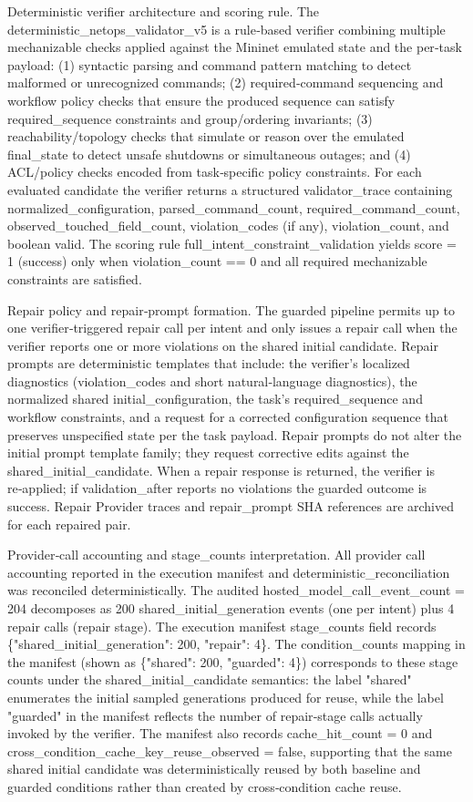 \documentclass[conference]{IEEEtran}
\begin{document}
Deterministic verifier architecture and scoring rule. The deterministic\_netops\_validator\_v5 is a rule‑based verifier combining multiple mechanizable checks applied against the Mininet emulated state and the per‑task payload: (1) syntactic parsing and command pattern matching to detect malformed or unrecognized commands; (2) required‑command sequencing and workflow policy checks that ensure the produced sequence can satisfy required\_sequence constraints and group/ordering invariants; (3) reachability/topology checks that simulate or reason over the emulated final\_state to detect unsafe shutdowns or simultaneous outages; and (4) ACL/policy checks encoded from task‑specific policy constraints. For each evaluated candidate the verifier returns a structured validator\_trace containing normalized\_configuration, parsed\_command\_count, required\_command\_count, observed\_touched\_field\_count, violation\_codes (if any), violation\_count, and boolean valid. The scoring rule full\_intent\_constraint\_validation yields score = 1 (success) only when violation\_count == 0 and all required mechanizable constraints are satisfied.

Repair policy and repair‑prompt formation. The guarded pipeline permits up to one verifier‑triggered repair call per intent and only issues a repair call when the verifier reports one or more violations on the shared initial candidate. Repair prompts are deterministic templates that include: the verifier's localized diagnostics (violation\_codes and short natural‑language diagnostics), the normalized shared initial\_configuration, the task's required\_sequence and workflow constraints, and a request for a corrected configuration sequence that preserves unspecified state per the task payload. Repair prompts do not alter the initial prompt template family; they request corrective edits against the shared\_initial\_candidate. When a repair response is returned, the verifier is re‑applied; if validation\_after reports no violations the guarded outcome is success. Repair Provider traces and repair\_prompt SHA references are archived for each repaired pair.

Provider‑call accounting and stage\_counts interpretation. All provider call accounting reported in the execution manifest and deterministic\_reconciliation was reconciled deterministically. The audited hosted\_model\_call\_event\_count = 204 decomposes as 200 shared\_initial\_generation events (one per intent) plus 4 repair calls (repair stage). The execution manifest stage\_counts field records \{"shared\_initial\_generation": 200, "repair": 4\}. The condition\_counts mapping in the manifest (shown as \{"shared": 200, "guarded": 4\}) corresponds to these stage counts under the shared\_initial\_candidate semantics: the label "shared" enumerates the initial sampled generations produced for reuse, while the label "guarded" in the manifest reflects the number of repair‑stage calls actually invoked by the verifier. The manifest also records cache\_hit\_count = 0 and cross\_condition\_cache\_key\_reuse\_observed = false, supporting that the same shared initial candidate was deterministically reused by both baseline and guarded conditions rather than created by cross‑condition cache reuse.
\end{document}
